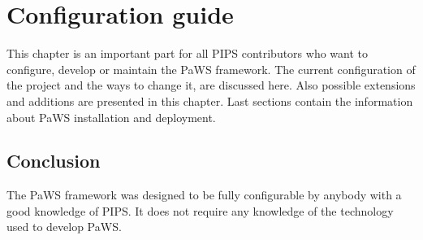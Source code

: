 \chapter{Configuration guide}
\label{configuration_guide}

This chapter is an important part for all PIPS contributors who want to configure, develop or maintain the PaWS framework. The current configuration of the project and the ways to change it, are discussed here. Also possible extensions and additions are presented in this chapter. Last sections contain the information about PaWS installation and deployment. 









\section{Conclusion}

The PaWS framework was designed to be fully configurable by anybody with a good knowledge of PIPS. It does not require any knowledge of the technology used to develop PaWS.


